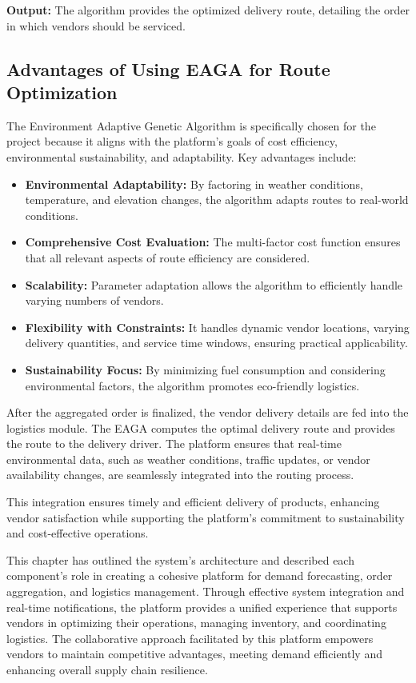 \textbf{Output:}
The algorithm provides the optimized delivery route, detailing the order in which vendors should be serviced.

\subsection{Advantages of Using EAGA for Route Optimization}

The Environment Adaptive Genetic Algorithm is specifically chosen for the project because it aligns with the platform's goals of cost efficiency, environmental sustainability, and adaptability. Key advantages include:

\begin{itemize}
    \item \textbf{Environmental Adaptability:} By factoring in weather conditions, temperature, and elevation changes, the algorithm adapts routes to real-world conditions.
    \item \textbf{Comprehensive Cost Evaluation:} The multi-factor cost function ensures that all relevant aspects of route efficiency are considered.
    \item \textbf{Scalability:} Parameter adaptation allows the algorithm to efficiently handle varying numbers of vendors.
    \item \textbf{Flexibility with Constraints:} It handles dynamic vendor locations, varying delivery quantities, and service time windows, ensuring practical applicability.
    \item \textbf{Sustainability Focus:} By minimizing fuel consumption and considering environmental factors, the algorithm promotes eco-friendly logistics.
\end{itemize}



After the aggregated order is finalized, the vendor delivery details are fed into the logistics module. The EAGA computes the optimal delivery route and provides the route to the delivery driver. The platform ensures that real-time environmental data, such as weather conditions, traffic updates, or vendor availability changes, are seamlessly integrated into the routing process.

This integration ensures timely and efficient delivery of products, enhancing vendor satisfaction while supporting the platform's commitment to sustainability and cost-effective operations.

This chapter has outlined the system's architecture and described each component's role in creating a cohesive platform for demand forecasting, order aggregation, and logistics management. Through effective system integration and real-time notifications, the platform provides a unified experience that supports vendors in optimizing their operations, managing inventory, and coordinating logistics. The collaborative approach facilitated by this platform empowers vendors to maintain competitive advantages, meeting demand efficiently and enhancing overall supply chain resilience.
